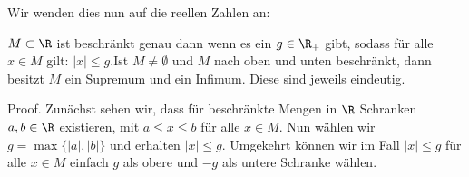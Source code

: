 \documentclass[letterpaper,10pt,english]{jupyterBook}
\begin{document}
Wir wenden dies nun auf die reellen Zahlen an:
\label{grundlagen/zahlensysteme:theorem-28}
\begin{theorem}{}{}



\(M \subset \R\) ist beschränkt genau dann wenn es ein \(g \in \R_+\) gibt, sodass für alle \(x \in M\) gilt: \(|x|\leq g\).Ist \(M \neq \emptyset\) und \(M\) nach oben und unten beschränkt, dann besitzt \(M\) ein Supremum und ein Infimum. Diese sind jeweils eindeutig.
\end{theorem}

\begin{emphBox}{}{}
Proof.  Zunächst sehen wir, dass für beschränkte Mengen in \(\R\) Schranken \(a,b \in \R\) existieren, mit \(a \leq x  \leq b\) für alle \(x \in M\). Nun wählen wir \(g=\max\{|a|,|b|\}\) und erhalten \(|x|\leq g\). Umgekehrt können wir im Fall \(|x|\leq g\) für alle \(x \in M\) einfach \(g\) als obere und \(-g\) als untere Schranke wählen.


\end{emphBox}
\end{document}
